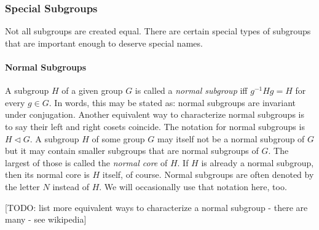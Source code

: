 


\subsubsection{Special Subgroups}
Not all subgroups are created equal. There are certain special types of subgroups that are important enough to deserve special names.





\paragraph{Normal Subgroups} A subgroup $H$ of a given group $G$ is called a \emph{normal subgroup} iff $g^{-1} H g = H$ for every $g \in G$. In words, this may be stated as: normal subgroups are invariant under conjugation. Another equivalent way to characterize normal subgroups is to say their left and right cosets coincide. The notation for normal subgroups is $H \triangleleft G$. A subgroup $H$ of some group $G$ may itself not be a normal subgroup of $G$ but it may contain smaller subgroups that are normal subgroups of $G$. The largest of those is called the \emph{normal core} of $H$. If $H$ is already a normal subgroup, then its normal core is $H$ itself, of course. Normal subgroups are often denoted by the letter $N$ instead of $H$. We will occasionally use that notation here, too.

[TODO: list more equivalent ways to characterize a normal subgroup - there are many - see wikipedia]





